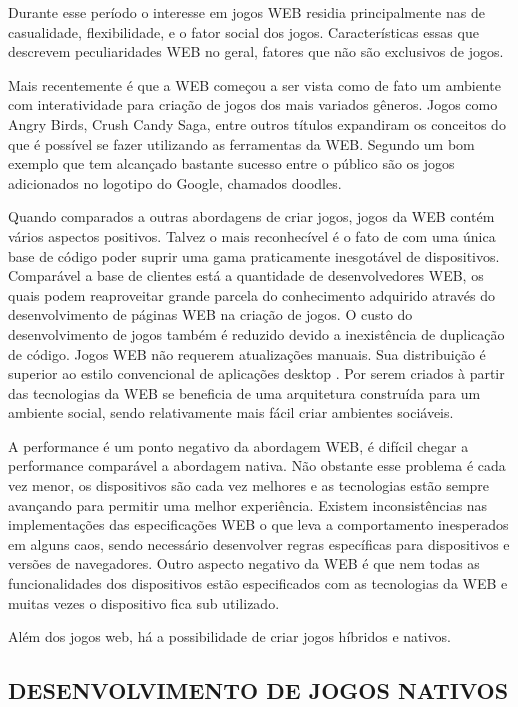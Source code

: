 \begin{draft}
Durante esse período o interesse em jogos WEB residia principalmente
nas de casualidade, flexibilidade, e o fator social dos jogos.
Características essas que descrevem peculiaridades WEB no geral,
fatores que não são exclusivos de jogos.

Mais recentemente é que a WEB começou a ser vista como de fato um
ambiente com interatividade para criação de jogos dos mais variados
gêneros. Jogos como Angry Birds, Crush Candy Saga, entre outros
títulos expandiram os conceitos do que é possível se fazer utilizando
as ferramentas da WEB. Segundo \cite[pp. 28]{gwt} um bom exemplo
que tem alcançado bastante sucesso entre o público são os jogos
adicionados no logotipo do Google, chamados doodles.

Quando comparados a outras abordagens de criar jogos, jogos da WEB
contém vários aspectos positivos. Talvez o mais reconhecível
é o fato de com uma única base de código poder suprir uma gama
praticamente inesgotável de dispositivos. Comparável a base de
clientes está a quantidade de desenvolvedores WEB, os quais podem
reaproveitar grande parcela do conhecimento adquirido através do
desenvolvimento de páginas WEB na criação de jogos. O custo do
desenvolvimento de jogos também é reduzido devido a inexistência de
duplicação de código. Jogos WEB não requerem atualizações manuais.
Sua distribuição é superior ao estilo convencional de aplicações
desktop \autocite{browserGamesTechnologyAndFuture}. Por serem
criados à partir das tecnologias da WEB se beneficia de uma arquitetura
construída para um ambiente social, sendo relativamente mais fácil
criar ambientes sociáveis.

A performance é um ponto negativo da abordagem WEB, é difícil
chegar a performance comparável a abordagem nativa. Não obstante
esse problema é cada vez menor, os dispositivos são cada vez
melhores e as tecnologias estão sempre avançando para permitir uma
melhor experiência. Existem inconsistências nas implementações
das especificações WEB o que leva a comportamento inesperados em
alguns caos, sendo necessário desenvolver regras específicas para
dispositivos e versões de navegadores. Outro aspecto negativo da WEB é
que nem todas as funcionalidades dos dispositivos estão especificados
com as tecnologias da WEB e muitas vezes o dispositivo fica sub
utilizado.

Além dos jogos web, há a possibilidade de criar jogos híbridos e nativos.

\subsection{DESENVOLVIMENTO DE JOGOS NATIVOS}


\end{draft}
